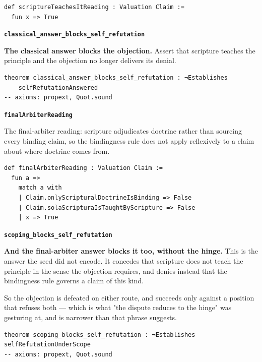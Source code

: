 \documentclass[11pt]{article}
\begin{document}
{\small\begin{verbatim}
def scriptureTeachesItReading : Valuation Claim :=
  fun x => True
\end{verbatim}}
\par\medskip\noindent\textbf{\texttt{classical\_\allowbreak{}answer\_\allowbreak{}blocks\_\allowbreak{}self\_\allowbreak{}refutation}}\par\nobreak\noindent
\textbf{The classical answer blocks the objection.} Assert that scripture teaches the principle and the objection no longer delivers its denial.

{\small\begin{verbatim}
theorem classical_answer_blocks_self_refutation : ¬Establishes
    selfRefutationAnswered
-- axioms: propext, Quot.sound
\end{verbatim}}
\par\medskip\noindent\textbf{\texttt{final\allowbreak{}Arbiter\allowbreak{}Reading}}\par\nobreak\noindent
The final-arbiter reading: scripture adjudicates doctrine rather than sourcing every binding claim, so the bindingness rule does not apply reflexively to a claim about where doctrine comes from.

{\small\begin{verbatim}
def finalArbiterReading : Valuation Claim :=
  fun a =>
    match a with
    | Claim.onlyScripturalDoctrineIsBinding => False
    | Claim.solaScripturaIsTaughtByScripture => False
    | x => True
\end{verbatim}}
\par\medskip\noindent\textbf{\texttt{scoping\_\allowbreak{}blocks\_\allowbreak{}self\_\allowbreak{}refutation}}\par\nobreak\noindent
\textbf{And the final-arbiter answer blocks it too, without the hinge.} This is the answer the seed did not encode. It concedes that scripture does not teach the principle in the sense the objection requires, and denies instead that the bindingness rule governs a claim of this kind.

So the objection is defeated on either route, and succeeds only against a position that refuses both — which is what "the dispute reduces to the hinge" was gesturing at, and is narrower than that phrase suggests.

{\small\begin{verbatim}
theorem scoping_blocks_self_refutation : ¬Establishes selfRefutationUnderScope
-- axioms: propext, Quot.sound
\end{verbatim}}
\end{document}
